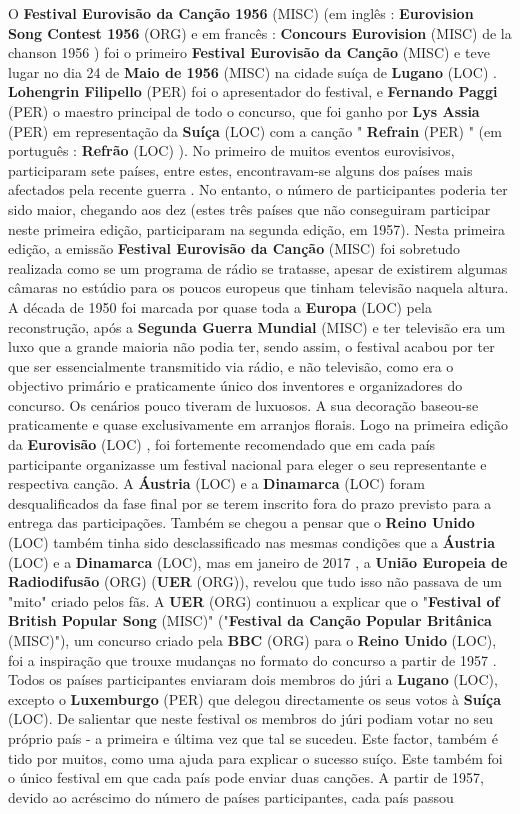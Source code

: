 \documentclass[12pt,a4paper]{article}
\begin{document}
O \textbf{Festival Eurovisão da Canção 1956} (MISC) (em inglês : \textbf{Eurovision Song Contest 1956} (ORG) e em francês : \textbf{Concours Eurovision} (MISC) de la chanson 1956 ) foi o primeiro \textbf{Festival Eurovisão da Canção} (MISC) e teve lugar no dia 24 de \textbf{Maio de 1956} (MISC) na cidade suíça de \textbf{Lugano} (LOC) . \textbf{Lohengrin Filipello} (PER) foi o apresentador do festival, e \textbf{Fernando Paggi} (PER) o maestro principal de todo o concurso, que foi ganho por \textbf{Lys Assia} (PER) em representação da \textbf{Suíça} (LOC) com a canção " \textbf{Refrain} (PER) " (em português : \textbf{Refrão} (LOC) ). No primeiro de muitos eventos eurovisivos, participaram sete países, entre estes, encontravam-se alguns dos países mais afectados pela recente guerra . No entanto, o número de participantes poderia ter sido maior, chegando aos dez (estes três países que não conseguiram participar neste primeira edição, participaram na segunda edição, em 1957). Nesta primeira edição, a emissão \textbf{Festival Eurovisão da Canção} (MISC) foi sobretudo realizada como se um programa de rádio se tratasse, apesar de existirem algumas câmaras no estúdio para os poucos europeus que tinham televisão naquela altura. A década de 1950 foi marcada por quase toda a \textbf{Europa} (LOC) pela reconstrução, após a \textbf{Segunda Guerra Mundial} (MISC) e ter televisão era um luxo que a grande maioria não podia ter, sendo assim, o festival acabou por ter que ser essencialmente transmitido via rádio, e não televisão, como era o objectivo primário e praticamente único dos inventores e organizadores do concurso. Os cenários pouco tiveram de luxuosos. A sua decoração baseou-se praticamente e quase exclusivamente em arranjos florais. Logo na primeira edição da \textbf{Eurovisão} (LOC) , foi fortemente recomendado que em cada país participante organizasse um festival nacional para eleger o seu representante e respectiva canção. A \textbf{Áustria} (LOC) e a \textbf{Dinamarca} (LOC) foram desqualificados da fase final por se terem inscrito fora do prazo previsto para a entrega das participações. Também se chegou a pensar que o \textbf{Reino Unido} (LOC) também tinha sido desclassificado nas mesmas condições que a \textbf{Áustria} (LOC) e a \textbf{Dinamarca} (LOC), mas em janeiro de 2017 , a \textbf{União Europeia de Radiodifusão} (ORG) (\textbf{UER} (ORG)), revelou que tudo isso não passava de um "mito" criado pelos fãs. A \textbf{UER} (ORG) continuou a explicar que o "\textbf{Festival of British Popular Song} (MISC)" ("\textbf{Festival da Canção Popular Britânica} (MISC)"), um concurso criado pela \textbf{BBC} (ORG) para o \textbf{Reino Unido} (LOC), foi a inspiração que trouxe mudanças no formato do concurso a partir de 1957 . Todos os países participantes enviaram dois membros do júri a \textbf{Lugano} (LOC), excepto o \textbf{Luxemburgo} (PER) que delegou directamente os seus votos à \textbf{Suíça} (LOC). De salientar que neste festival os membros do júri podiam votar no seu próprio país - a primeira e última vez que tal se sucedeu. Este factor, também é tido por muitos, como uma ajuda para explicar o sucesso suíço. Este também foi o único festival em que cada país pode enviar duas canções. A partir de 1957, devido ao acréscimo do número de países participantes, cada país passou 
\end{document}
